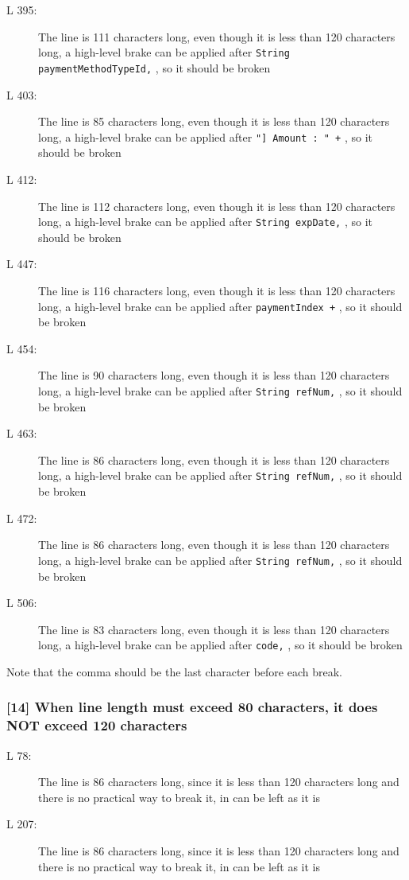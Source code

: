 \begin{description}
	\item[L 395:] The line is 111 characters long, even though it is less than 120 characters long, a high-level brake can be applied after {\tt String paymentMethodTypeId,} , so it should be broken
	\item[L 403:] The line is 85 characters long, even though it is less than 120 characters long, a high-level brake can be applied after {\tt "] Amount : " +} , so it should be broken
	\item[L 412:] The line is 112 characters long, even though it is less than 120 characters long, a high-level brake can be applied after {\tt String expDate,} , so it should be broken
	\item[L 447:] The line is 116 characters long, even though it is less than 120 characters long, a high-level brake can be applied after {\tt paymentIndex +} , so it should be broken
	\item[L 454:] The line is 90 characters long, even though it is less than 120 characters long, a high-level brake can be applied after {\tt String refNum,} , so it should be broken
	\item[L 463:] The line is 86 characters long, even though it is less than 120 characters long, a high-level brake can be applied after {\tt String refNum,} , so it should be broken
	\item[L 472:] The line is 86 characters long, even though it is less than 120 characters long, a high-level brake can be applied after {\tt String refNum,} , so it should be broken
	\item[L 506:] The line is 83 characters long, even though it is less than 120 characters long, a high-level brake can be applied after {\tt code,} , so it should be broken
	
\end{description}
Note that the comma should be the last character before each break.

\subsubsection*{[14] When line length must exceed 80 characters, it does NOT exceed 120 characters}
\begin{description}
	\item[L 78:] The line is 86 characters long, since it is less than 120 characters long and there is no practical way to break it, in can be left as it is
	\item[L 207:] The line is 86 characters long, since it is less than 120 characters long and there is no practical way to break it, in can be left as it is
\end{description}

